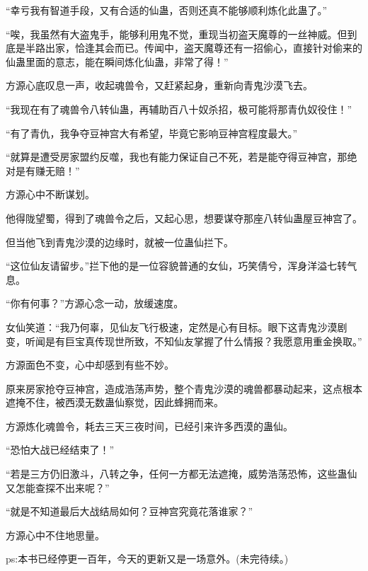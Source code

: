 \begin{this_body}
“幸亏我有智道手段，又有合适的仙蛊，否则还真不能够顺利炼化此蛊了。”

“唉，我虽然有大盗鬼手，能够利用鬼不觉，重现当初盗天魔尊的一丝神威。但到底是半路出家，恰逢其会而已。传闻中，盗天魔尊还有一招偷心，直接针对偷来的仙蛊里面的意志，能在瞬间炼化仙蛊，非常了得！”

方源心底叹息一声，收起魂兽令，又赶紧起身，重新向青鬼沙漠飞去。

“我现在有了魂兽令八转仙蛊，再辅助百八十奴杀招，极可能将那青仇奴役住！”

“有了青仇，我争夺豆神宫大有希望，毕竟它影响豆神宫程度最大。”

“就算是遭受房家盟约反噬，我也有能力保证自己不死，若是能夺得豆神宫，那绝对是有赚无赔！”

方源心中不断谋划。

他得陇望蜀，得到了魂兽令之后，又起心思，想要谋夺那座八转仙蛊屋豆神宫了。

但当他飞到青鬼沙漠的边缘时，就被一位蛊仙拦下。

“这位仙友请留步。”拦下他的是一位容貌普通的女仙，巧笑倩兮，浑身洋溢七转气息。

“你有何事？”方源心念一动，放缓速度。

女仙笑道：“我乃何辜，见仙友飞行极速，定然是心有目标。眼下这青鬼沙漠剧变，听闻是有巨宝真传现世所致，不知仙友掌握了什么情报？我愿意用重金换取。”

方源面色不变，心中却感到有些不妙。

原来房家抢夺豆神宫，造成浩荡声势，整个青鬼沙漠的魂兽都暴动起来，这点根本遮掩不住，被西漠无数蛊仙察觉，因此蜂拥而来。

方源炼化魂兽令，耗去三天三夜时间，已经引来许多西漠的蛊仙。

“恐怕大战已经结束了！”

“若是三方仍旧激斗，八转之争，任何一方都无法遮掩，威势浩荡恐怖，这些蛊仙又怎能查探不出来呢？”

“就是不知道最后大战结局如何？豆神宫究竟花落谁家？”

方源心中不住地思量。

ps:本书已经停更一百年，今天的更新又是一场意外。(未完待续。)

\end{this_body}

